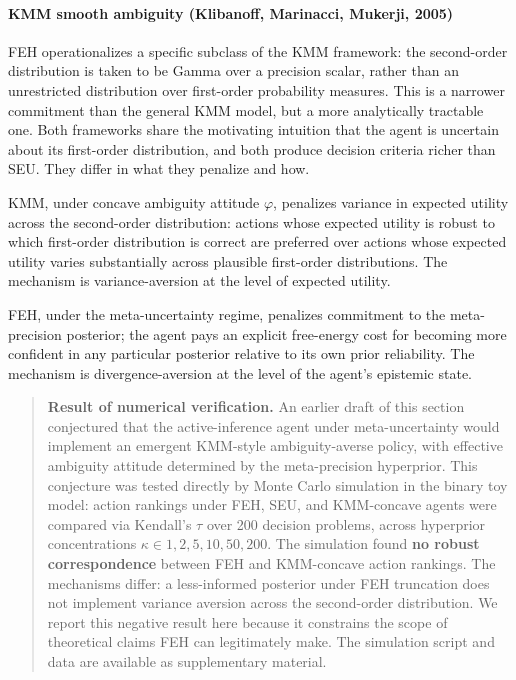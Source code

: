 \documentclass{article}
\begin{document}
\paragraph{KMM smooth ambiguity (Klibanoff, Marinacci, Mukerji,
2005)}\label{kmm-smooth-ambiguity-klibanoff-marinacci-mukerji-2005}

FEH operationalizes a specific subclass of the KMM framework: the
second-order distribution is taken to be Gamma over a precision scalar,
rather than an unrestricted distribution over first-order probability
measures. This is a narrower commitment than the general KMM model, but
a more analytically tractable one. Both frameworks share the motivating
intuition that the agent is uncertain about its first-order
distribution, and both produce decision criteria richer than SEU. They
differ in what they penalize and how.

KMM, under concave ambiguity attitude \ensuremath{\varphi}, penalizes variance in expected
utility across the second-order distribution: actions whose expected
utility is robust to which first-order distribution is correct are
preferred over actions whose expected utility varies substantially
across plausible first-order distributions. The mechanism is
variance-aversion at the level of expected utility.

FEH, under the meta-uncertainty regime, penalizes commitment to the
meta-precision posterior; the agent pays an explicit free-energy cost
for becoming more confident in any particular posterior relative to its
own prior reliability. The mechanism is divergence-aversion at the level
of the agent's epistemic state.

\begin{quote}
\textbf{Result of numerical verification.} An earlier draft of this
section conjectured that the active-inference agent under
meta-uncertainty would implement an emergent KMM-style ambiguity-averse
policy, with effective ambiguity attitude determined by the
meta-precision hyperprior. This conjecture was tested directly by Monte
Carlo simulation in the binary toy model: action rankings under FEH,
SEU, and KMM-concave agents were compared via Kendall's \(\tau\) over
200 decision problems, across hyperprior concentrations
\(\kappa \in 1,2,5,10,50,200\). The simulation found \textbf{no robust
correspondence} between FEH and KMM-concave action rankings. The
mechanisms differ: a less-informed posterior under FEH truncation does
not implement variance aversion across the second-order distribution. We
report this negative result here because it constrains the scope of
theoretical claims FEH can legitimately make. The simulation script and
data are available as supplementary material.
\end{quote}
\end{document}

